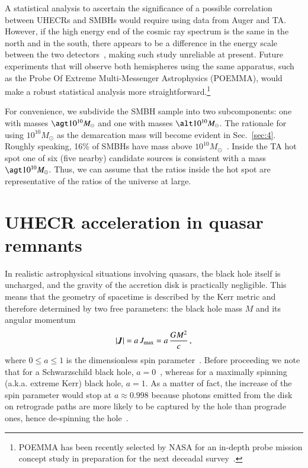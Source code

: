 \documentclass[aps,prd,twocolumn,superscriptaddress,tightenlines,nofootinbib]{revtex4-1}
\begin{document}
 A statistical analysis to ascertain the significance of a
  possible correlation between UHECRs and SMBHs would require using
  data from Auger and TA. However, if the high energy end of the
  cosmic ray spectrum is the same in the north and in the south, there
  appears to be a difference in the energy scale between the two
  detectors~\cite{Dawson:2013wsa}, making such study unreliable at present.  Future
  experiments that will observe both hemispheres using the same
  apparatus, such as the Probe Of Extreme Multi-Messenger
  Astrophysics (POEMMA),  would make a robust
  statistical analysis more straightforward.\footnote{POEMMA has been
    recently selected by NASA for an in-depth probe mission concept
    study in preparation for the next deceadal survey~\cite{Adams:2017fjh}.}

 For convenience, we subdivide the SMBH sample into two
  subcomponents: one with masses $\agt 10^{10} M_\odot$ and one with
  masses $\alt 10^{10} M_\odot$.  The rationale for using $10^{10}
  M_\odot$ as the demarcation mass will become evident in
  Sec.~\ref{sec:4}. Roughly speaking, 16\% of SMBHs have mass above
  $10^{10} M_\odot$~\cite{Isola:2003jk}. Inside the TA hot spot one of six (five nearby) candidate
  sources is consistent with a mass$ \agt 10^{10} M_\odot$. Thus, we
  can assume that the ratios inside the hot spot are representative of
  the ratios of the universe at large.



\section{UHECR acceleration in quasar remnants}
\label{sec:3}



In realistic astrophysical situations involving quasars, the black hole
itself is uncharged, and the gravity of the accretion disk is practically
negligible. This means that the geometry of spacetime  is described by the
Kerr metric and therefore determined by two free parameters: the black hole
mass $M$ and its
angular momentum 
\begin{equation}
|\bm{J}| = a \, J_{\rm max} = a \, \frac{GM^2}{c} \,,
\end{equation}
where $0 \leq a \leq 1$ is the dimensionless spin parameter~\cite{Kerr:1963ud}.  Before
proceeding we note  that for a Schwarzschild
black hole, $a = 0$~\cite{Schwarzschild:1916uq}, whereas for a maximally spinning (a.k.a. extreme Kerr)
black hole, $a =1$. As a matter of fact, the increase of the spin parameter would
stop at $a \approx 0.998$ because photons emitted from
the disk on retrograde paths are more likely to be captured by the
hole than prograde ones, hence de-spinning the hole~\cite{Thorne:1974ve}.
\end{document}
